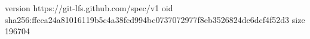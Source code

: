version https://git-lfs.github.com/spec/v1
oid sha256:ffcca24a81016119b5c4a38fcd994bc0737072977f8eb3526824dc6dcf4f52d3
size 196704
